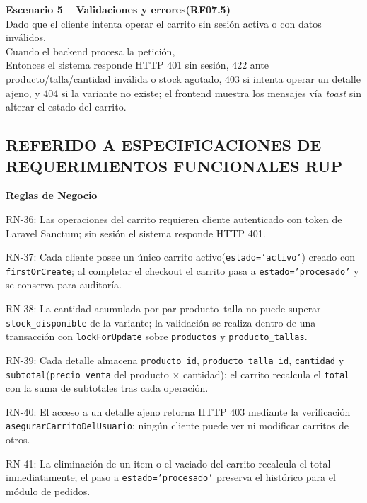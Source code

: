 \documentclass[12pt,a4paper]{article}
\begin{document}
\vspace{0.3em}

\textbf{Escenario 5 -- Validaciones y errores(RF07.5)}\\
Dado que el cliente intenta operar el carrito sin sesión activa o con datos inválidos,\\
Cuando el backend procesa la petición,\\
Entonces el sistema responde HTTP 401 sin sesión, 422 ante producto/talla/cantidad inválida o stock agotado, 403 si intenta operar un detalle ajeno, y 404 si la variante no existe; el frontend muestra los mensajes vía \textit{toast} sin alterar el estado del carrito.

\subsection*{REFERIDO A ESPECIFICACIONES DE REQUERIMIENTOS FUNCIONALES RUP}

\textbf{Reglas de Negocio}

RN-36: Las operaciones del carrito requieren cliente autenticado con token de Laravel Sanctum; sin sesión el sistema responde HTTP 401.

RN-37: Cada cliente posee un único carrito activo(\texttt{estado='activo'}) creado con \texttt{firstOrCreate}; al completar el checkout el carrito pasa a \texttt{estado='procesado'} y se conserva para auditoría.

RN-38: La cantidad acumulada por par producto--talla no puede superar \texttt{stock\_disponible} de la variante; la validación se realiza dentro de una transacción con \texttt{lockForUpdate} sobre \texttt{productos} y \texttt{producto\_tallas}.

RN-39: Cada detalle almacena \texttt{producto\_id}, \texttt{producto\_talla\_id}, \texttt{cantidad} y \texttt{subtotal}(\texttt{precio\_venta} del producto $\times$ cantidad); el carrito recalcula el \texttt{total} con la suma de subtotales tras cada operación.

RN-40: El acceso a un detalle ajeno retorna HTTP 403 mediante la verificación \texttt{asegurarCarritoDelUsuario}; ningún cliente puede ver ni modificar carritos de otros.

RN-41: La eliminación de un item o el vaciado del carrito recalcula el total inmediatamente; el paso a \texttt{estado='procesado'} preserva el histórico para el módulo de pedidos.
\end{document}
